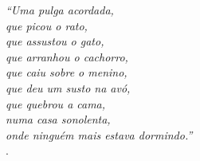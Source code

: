 \begin{epigrafe}
	\vspace*{\fill}
	\begin{flushright}
        \textit{``Uma pulga acordada,\\
		que picou o rato,\\
		que assustou o gato,\\
		que arranhou o cachorro,\\
		que caiu sobre o menino,\\
		que deu um susto na avó,\\
		que quebrou a cama,\\
		numa casa sonolenta,\\
		onde ninguém mais estava dormindo.''\\}
        \cite{casasonolenta}.
	\end{flushright}
\end{epigrafe}